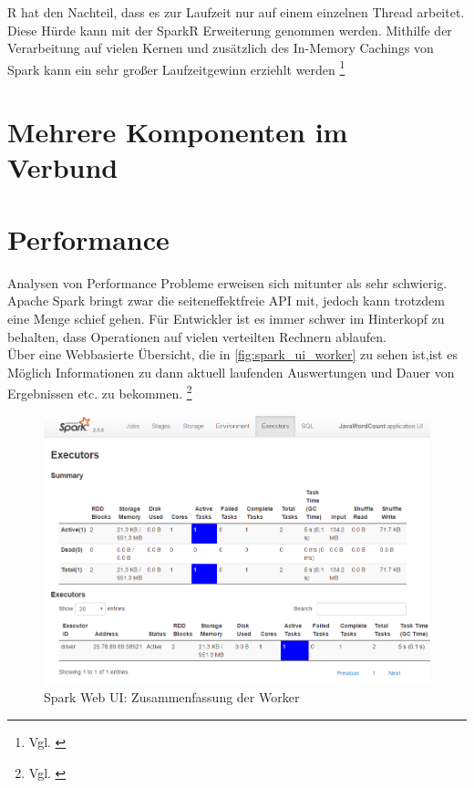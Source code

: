 \noindent
R hat den Nachteil, dass es zur Laufzeit nur auf einem einzelnen Thread arbeitet. Diese Hürde kann mit der SparkR Erweiterung genommen werden. Mithilfe der Verarbeitung auf vielen Kernen und zusätzlich des In-Memory Cachings von Spark kann ein sehr großer Laufzeitgewinn erziehlt werden \footnote{Vgl. \cite{VYL+16}}

\newpage
\section{Mehrere Komponenten im Verbund}






\newpage
\section{Performance}
Analysen von Performance Probleme erweisen sich mitunter als sehr schwierig. Apache Spark bringt zwar die seiteneffektfreie API mit, jedoch kann trotzdem eine Menge schief gehen. Für Entwickler ist es immer schwer im Hinterkopf zu behalten, dass Operationen auf vielen verteilten Rechnern ablaufen. \\ 

\noindent
Über eine Webbasierte Übersicht, die in \autoref{fig:spark_ui_worker} zu sehen ist,ist es Möglich Informationen zu dann aktuell laufenden Auswertungen und Dauer von Ergebnissen etc. zu bekommen. \footnote{Vgl. \cite[12]{AAWS15}}

\begin{figure}[h]
  \centering
  \includegraphics[width=\textwidth]{./bilder/spark_ui_worker.PNG}
  \caption{Spark Web UI: Zusammenfassung der Worker}\label{fig:spark_ui_worker}
\end{figure}

